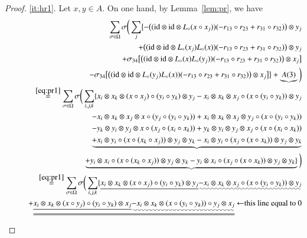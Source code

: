 \documentclass[12pt, reqno, a4paper]{amsart}
\theoremstyle{definition}
\newcommand{\id}{\mathrm{id}}
\begin{document}
\begin{proof}
	\ref{it:hr1}. Let $x, y \in A$. On one hand, by Lemma~\ref{lem:pr}, we have
	\begin{eqnarray*}
		&&\sum_{\sigma \in \Omega}\sigma\bigg(\sum_{j} \bigl\{ -\big((\id \otimes \id \otimes L_{\circ}(x \circ x_j)) (-r_{13} \circ r_{23} + r_{31} \circ r_{32}) \big) \otimes y_j \\
		&&\quad + \big( (\id \otimes \id \otimes L_{\circ}(x_j) L_{\circ}(x) ) (-r_{13} \circ r_{23} + r_{31} \circ r_{32}) \big) \otimes y_j \\
		&&\quad + \sigma_{34} \bigl[ \big( (\id \otimes \id \otimes L_{\circ}(x) L_{\circ}(y_j)) (-r_{13} \circ r_{23} + r_{31} \circ r_{32}) \big) \otimes x_j \bigr] \\
		&&\quad - \sigma_{34} \bigl[ \big( (\id \otimes \id \otimes L_{\circ}(y_j) L_{\circ}(x)) (-r_{13} \circ r_{23} + r_{31} \circ r_{32}) \big) \otimes x_j \bigr] \bigr\} + \underbrace{A(3)} \bigg) \\
		&&\overset{\eqref{eq:pr1}}{=} \sum_{\sigma \in \Omega}\sigma\bigg( \sum_{i,j, k} \{ x_i \otimes x_k \otimes (x \circ x_j) \circ (y_i \circ y_k) \otimes y_j - x_i \otimes x_k \otimes x_j \circ (x \circ (y_i \circ y_k)) \otimes y_j \\
		&&\quad\quad - x_i \otimes x_k \otimes x_j \otimes x \circ (y_j \circ (y_i \circ y_k)) + x_i \otimes x_k \otimes x_j \otimes y_j \circ (x \circ (y_i \circ y_k)) \\
		&&\quad\quad - y_k \otimes y_i \otimes y_j \otimes x \circ (x_j \circ (x_i \circ x_k)) + y_k \otimes y_i \otimes y_j \otimes x_j \circ (x \circ (x_i \circ x_k)) \\
		&&\quad\quad \underbrace{ + x_i \otimes y_i \circ (x \circ (x_k \circ x_j)) \otimes y_j \otimes y_k - x_i \otimes y_i \circ (x_j \circ (x \circ x_k)) \otimes y_j \otimes y_k} \\
		&&\quad\quad \underbrace{ + y_i \otimes x_i \circ (x \circ (x_k \circ x_j)) \otimes y_j \otimes y_k - y_i \otimes x_i \circ (x_j \circ (x \circ x_k)) \otimes y_j \otimes y_k \}} \bigg) \\
		&&\overset{\eqref{eq:pr1}}{=}\sum_{\sigma \in \Omega}\sigma\bigg( \sum_{i,j, k} \{ \uline{ x_i \otimes x_k \otimes (x \circ x_j) \circ (y_i \circ y_k) \otimes y_j} \uwave{ - x_i \otimes x_k \otimes x_j \circ (x \circ (y_i \circ y_k)) \otimes y_j} \\
		&&\quad\quad + \uuline{ \uline{x_i \otimes x_k \otimes (x \circ y_j) \circ (y_i \circ y_k) \otimes x_j} \uwave{ - x_i \otimes x_k \otimes (x \circ (y_i \circ y_k) )\circ y_j \otimes x_j} }  \;\text{$\leftarrow$this line equal to 0}\\

\end{eqnarray*}
\end{proof}
\end{document}
